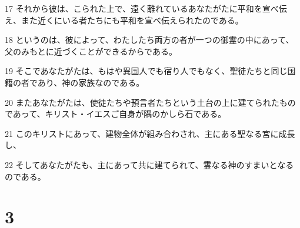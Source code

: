 \par 17 それから彼は、こられた上で、遠く離れているあなたがたに平和を宣べ伝え、また近くにいる者たちにも平和を宣べ伝えられたのである。
\par 18 というのは、彼によって、わたしたち両方の者が一つの御霊の中にあって、父のみもとに近づくことができるからである。
\par 19 そこであなたがたは、もはや異国人でも宿り人でもなく、聖徒たちと同じ国籍の者であり、神の家族なのである。
\par 20 またあなたがたは、使徒たちや預言者たちという土台の上に建てられたものであって、キリスト・イエスご自身が隅のかしら石である。
\par 21 このキリストにあって、建物全体が組み合わされ、主にある聖なる宮に成長し、
\par 22 そしてあなたがたも、主にあって共に建てられて、霊なる神のすまいとなるのである。

\chapter{3}

